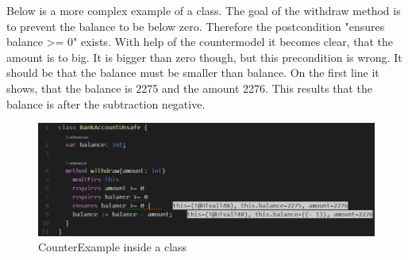 Below is a more complex example of a class. The goal of the withdraw method is to prevent the balance to be below zero. Therefore the postcondition "ensures balance >= 0" exists. With help of the countermodel it becomes clear, that the amount is to big. It is bigger than zero though, but this precondition is wrong. It should be that the balance must be smaller than balance. On the first line it shows, that the balance is 2275 and the amount 2276. This results that the balance is after the subtraction negative. 
\begin{figure}[H]
	\centering
	\includegraphics[width=1\textwidth]{img/counterModelBank}
	\caption{CounterExample inside a class}
	\label{fig:counterModelBank}
\end{figure}
